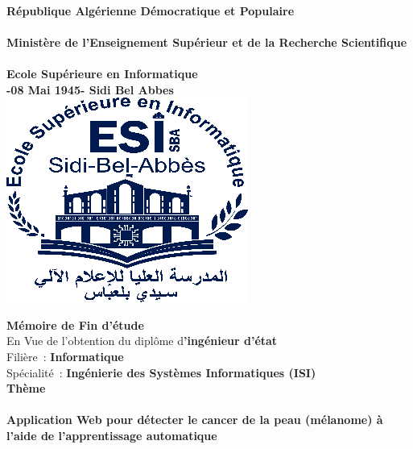 \begin{titlepage}
    \begin{center}	
         \\
        \textbf{République Algérienne Démocratique et Populaire} \\
         \\
        \textbf{Ministère de l’Enseignement Supérieur et de la Recherche Scientifique} \\
         \\
        \textbf{Ecole Supérieure en Informatique} \\
        \textbf{-08 Mai 1945- Sidi Bel Abbes} \\

        \bigskip
        \includegraphics[]{./cover-page/logo.png}
        \bigskip
        
        \textbf{Mémoire de Fin d’étude} \\
        \vspace{0.2cm}
        En Vue de l’obtention du diplôme d\textbf{’ingénieur d’état} \\
        \vspace{0.2cm}
        Filière : \textbf{Informatique}\\
        \vspace{0.2cm}
        Spécialité : \textbf{Ingénierie des Systèmes Informatiques (ISI)}\\
        \LARGE
        \textbf{Thème} \\
        \hrulefill \\
        \normalsize
        \textbf{Application Web pour détecter le cancer de la peau (mélanome) à l'aide de l'apprentissage automatique} \\
        \hrulefill \\




\end{center}
\end{titlepage}
